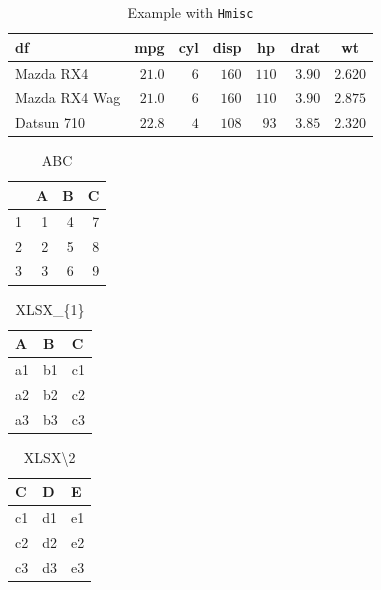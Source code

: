 \documentclass{article}\usepackage[]{graphicx}\usepackage[]{xcolor}
\begin{document}
\begin{table}[!tbp]
\caption{Example with  \texttt{Hmisc}\label{df}} 
\begin{center}
\begin{tabular}{lrrrrrr}
\hline\hline
\multicolumn{1}{l}{df}&\multicolumn{1}{c}{mpg}&\multicolumn{1}{c}{cyl}&\multicolumn{1}{c}{disp}&\multicolumn{1}{c}{hp}&\multicolumn{1}{c}{drat}&\multicolumn{1}{c}{wt}\tabularnewline
\hline
Mazda RX4&$21.0$&$6$&$160$&$110$&$3.90$&$2.620$\tabularnewline
Mazda RX4 Wag&$21.0$&$6$&$160$&$110$&$3.90$&$2.875$\tabularnewline
Datsun 710&$22.8$&$4$&$108$&$ 93$&$3.85$&$2.320$\tabularnewline
\hline
\end{tabular}\end{center}
\end{table}
\begin{table}[ht]
\centering
\begin{tabular}{rrrr}
  \hline
 & A & B & C \\ 
  \hline
1 &   1 &   4 &   7 \\ 
  2 &   2 &   5 &   8 \\ 
  3 &   3 &   6 &   9 \\ 
   \hline
\end{tabular}
\caption{ABC} 
\end{table}
\begin{table}[ht]
\centering
\begin{tabular}{lll}
  \hline
A & B & C \\ 
  \hline
a1 & b1 & c1 \\ 
  a2 & b2 & c2 \\ 
  a3 & b3 & c3 \\ 
   \hline
\end{tabular}
\caption{XLSX\_\{1\}} 
\end{table}
\begin{table}[ht]
\centering
\begin{tabular}{lll}
  \hline
C & D & E \\ 
  \hline
c1 & d1 & e1 \\ 
  c2 & d2 & e2 \\ 
  c3 & d3 & e3 \\ 
   \hline
\end{tabular}
\caption{XLSX\textbackslash{}2} 
\end{table}
\end{document}

